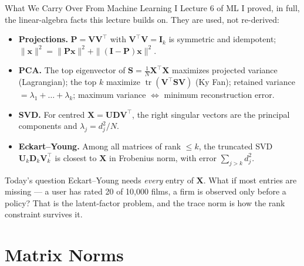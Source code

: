 \documentclass[notes,11pt, aspectratio=169]{beamer}
\begin{document}







\begin{frame}{What We Carry Over From Machine Learning I}\small
Lecture 6 of ML I proved, in full, the linear-algebra facts this lecture builds on. They are used, not re-derived:
\begin{itemize}
  \item \textbf{Projections.} $\mathbf{P}=\mathbf{V}\mathbf{V}^\top$ with $\mathbf{V}^\top\mathbf{V}=\mathbf{I}_k$ is symmetric and idempotent; $\|\mathbf{x}\|^2=\|\mathbf{P}\mathbf{x}\|^2+\|(\mathbf{I}-\mathbf{P})\mathbf{x}\|^2$.
  \item \textbf{PCA.} The top eigenvector of $\mathbf{S}=\tfrac1N\mathbf{X}^\top\mathbf{X}$ maximizes projected variance (Lagrangian); the top $k$ maximize $\operatorname{tr}(\mathbf{V}^\top\mathbf{S}\mathbf{V})$ (Ky Fan); retained variance $=\lambda_1+\dots+\lambda_k$; maximum variance $\Leftrightarrow$ minimum reconstruction error.
  \item \textbf{SVD.} For centred $\mathbf{X}=\mathbf{U}\mathbf{D}\mathbf{V}^\top$, the right singular vectors are the principal components and $\lambda_j=d_j^2/N$.
  \item \textbf{Eckart--Young.} Among all matrices of rank $\le k$, the truncated SVD $\mathbf{U}_k\mathbf{D}_k\mathbf{V}_k^\top$ is closest to $\mathbf{X}$ in Frobenius norm, with error $\sum_{j>k}d_j^2$.
\end{itemize}
\begin{alertblock}{Today's question}
Eckart--Young needs \emph{every} entry of $\mathbf{X}$. What if most entries are missing --- a user has rated 20 of 10{,}000 films, a firm is observed only before a policy? That is the latent-factor problem, and the trace norm is how the rank constraint survives it.
\end{alertblock}
\end{frame}


\section{Matrix Norms}
\end{document}
